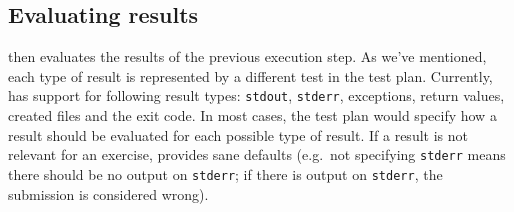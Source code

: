 \documentclass[5p,number]{elsarticle}
\begin{document}
    \subsection{Evaluating results}\label{subsec:evaluating-the-results}
    
    \tested{} then evaluates the results of the previous execution step.
    As we've mentioned, each type of result is represented by a different test in the test plan.
    Currently, \tested{} has support for following result types: \texttt{stdout}, \texttt{stderr}, exceptions, return values, created files and the exit code.
    In most cases, the test plan would specify how a result should be evaluated for each possible type of result.
    If a result is not relevant for an exercise, \tested{} provides sane defaults (e.g.\ not specifying \texttt{stderr} means there should be no output on \texttt{stderr}; if there is output on \texttt{stderr}, the submission is considered wrong).
\end{document}
